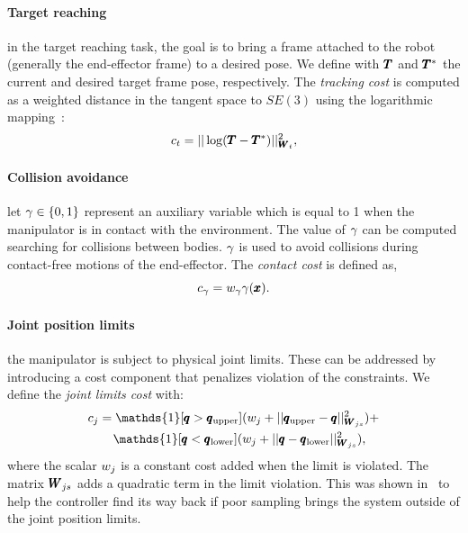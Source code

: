 \paragraph{Target reaching} in the target reaching task, the goal is to bring a frame attached to the robot (generally the end-effector frame) to a desired pose. We define with $\pmb{T}$ and $\pmb{T}^*$ the current and desired target frame pose, respectively. The \textit{tracking cost} is computed as a weighted distance in the tangent space to $SE(3)$ using the logarithmic mapping~\cite{blanco2010tutorial}:
\begin{equation} \label{eq:tracking_cost}
     c_{t} = || \log(\pmb{T} - \pmb{T}^{*}) ||^2_{\pmb{W}_{t}},
 \end{equation}
 
 \paragraph{Collision avoidance} let $\gamma \in \{0, 1\}$ represent an auxiliary variable which is equal to 1 when the manipulator is in contact with the environment. The value of $\gamma$ can be computed searching for collisions between bodies. 
 $\gamma$ is used to avoid collisions during contact-free motions of the end-effector. 
 The \textit{contact cost} is defined as,
 \begin{equation}
     c_{\gamma}= w_{\gamma} \gamma(\pmb{x}).
 \end{equation}

 \paragraph{Joint position limits} the manipulator is subject to physical joint limits. These can be addressed by introducing a cost component that penalizes violation of the constraints. We define the \textit{joint limits cost} with:
 \begin{align}
     &c_{j} = \mathds{1}[\configRobot > \upperLimits](\weightScalar{j} + ||\upperLimits - \configRobot||^2_{\weightMatrix{js}}) + \nonumber\\ 
     &\qquad\mathds{1}[\configRobot < \lowerLimits](\weightScalar{j} +  || \configRobot - \lowerLimits||^2_{\weightMatrix{js}}), 
 \end{align}
 where the scalar $w_{j}$ is a constant cost added when the limit is violated. The matrix $\pmb{W}_{js}$ adds a quadratic term in the limit violation. This was shown in~\cite{williams_information-theoretic_2018} to help the controller find its way back if poor sampling brings the system outside of the joint position limits.
 
